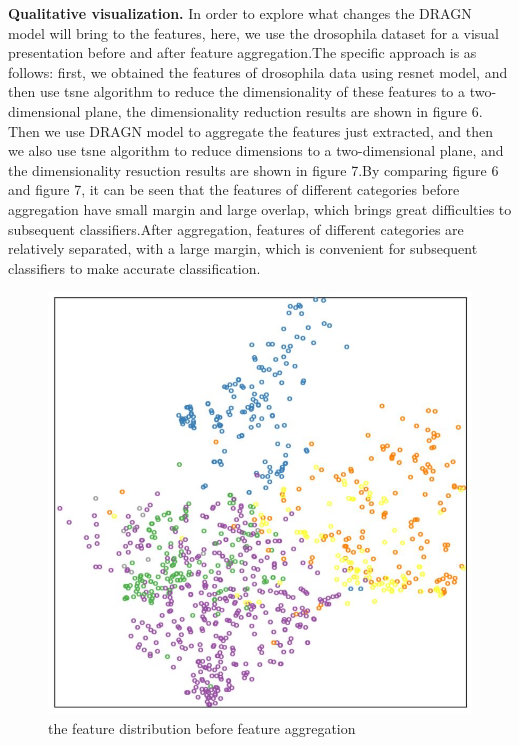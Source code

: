 \documentclass[10pt,twocolumn,letterpaper]{article}
\begin{document}
\textbf{Qualitative visualization.} In order to explore what changes the DRAGN model will bring to the features, here, we use the drosophila dataset for a visual presentation before and after feature aggregation.The specific approach is as follows: first, we obtained the features of drosophila data using resnet model, and then use tsne algorithm to reduce the dimensionality of these features to a two-dimensional plane, the dimensionality reduction results are shown in figure 6. Then we use DRAGN model to aggregate the features just extracted, and then we also use tsne algorithm to reduce dimensions to a two-dimensional plane, and the dimensionality resuction results are shown in figure 7.By comparing figure 6 and figure 7, it can be seen that the features of different categories before aggregation have small margin and large overlap, which brings great difficulties to subsequent classifiers.After aggregation, features of different categories are relatively separated, with a large margin, which is convenient for subsequent classifiers to make accurate classification.


\begin{figure}[t]
\begin{center}
  \includegraphics[width=0.9\linewidth]{original.JPG}
\end{center}
  \caption{the feature distribution before feature aggregation}
\label{fig:long}
\label{fig:onecol}
\end{figure}
\end{document}
